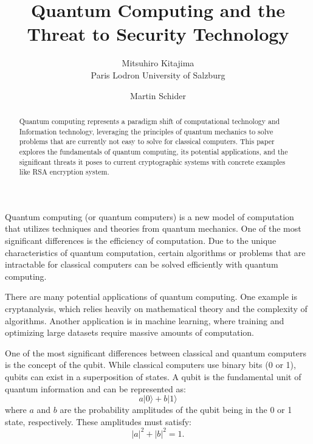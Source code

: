 \documentclass[10pt,twocolumn]{article}          %
\begin{document}
    \title{Quantum Computing and the Threat to Security Technology}

    \author{Mitsuhiro Kitajima\\
    Paris Lodron University of Salzburg\\
    \and
    Martin Schider\\
    }

    \maketitle
    \thispagestyle{empty}

    \begin{abstract}
        Quantum computing represents a paradigm shift of computational technology and Information technology, leveraging the principles of quantum mechanics to solve problems that are currently not easy to solve for classical computers.
        This paper explores the fundamentals of quantum computing, its potential applications, and the significant threats it poses to current cryptographic systems with concrete examples like RSA encryption system.
    \end{abstract}


    Quantum computing (or quantum computers) is a new model of computation that utilizes techniques and theories from quantum mechanics. One of the most significant differences is the efficiency of computation. Due to the unique characteristics of quantum computation, certain algorithms or problems that are intractable for classical computers can be solved efficiently with quantum computing.

    There are many potential applications of quantum computing. One example is cryptanalysis, which relies heavily on mathematical theory and the complexity of algorithms. Another application is in machine learning, where training and optimizing large datasets require massive amounts of computation.

    One of the most significant differences between classical and quantum computers is the concept of the qubit. While classical computers use binary bits (0 or 1), qubits can exist in a superposition of states. A qubit is the fundamental unit of quantum information and can be represented as:
    \[
        a|0\rangle + b|1\rangle
    \]
    where \(a\) and \(b\) are the probability amplitudes of the qubit being in the 0 or 1 state, respectively. These amplitudes must satisfy:
    \[
        |a|^2 + |b|^2 = 1.
    \]
\end{document}
